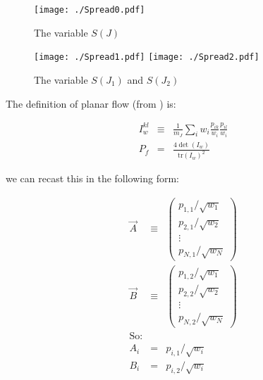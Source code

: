 \begin{figure}[H]
    \begin{center}
        \texttt{[image: ./Spread0.pdf]}
        \caption{ The variable $S\left(J\right)$  }
        \label{fig:Spread0}
    \end{center}
\end{figure}

\begin{figure}[H]
    \begin{center}
        \texttt{[image: ./Spread1.pdf]}
        \texttt{[image: ./Spread2.pdf]}\\
        \caption{ The variable $S\left(J_1\right)$  and $S\left(J_2\right)$ }
        \label{fig:SpreadX}
    \end{center}
\end{figure}

The definition of planar flow (from \cite{PlanarFlow}) is:

\begin{eqnarray*}
	I_{w}^{kl} & \equiv & \frac{1}{m_{J}}\sum_{i}w_{i}\frac{p_{ik}}{w_{i}}\frac{p_{il}}{w_{i}}\\
	P_{f} & = & \frac{4\det\left(I_{w}\right)}{\text{tr}\left(I_{w}\right)^{2}}
\end{eqnarray*}

we can recast this in the following form:


\begin{eqnarray*}
	\vec{A} & \equiv & \left(\begin{array}{c}
		p_{1,1}/\sqrt{w_{1}}\\
		p_{2,1}/\sqrt{w_{2}}\\
		\vdots\\
		p_{N,1}/\sqrt{w_{N}}
	\end{array}\right)\\
	\vec{B} & \equiv & \left(\begin{array}{c}
		p_{1,2}/\sqrt{w_{1}}\\
		p_{2,2}/\sqrt{w_{2}}\\
		\vdots\\
		p_{N,2}/\sqrt{w_{N}}
	\end{array}\right)\\
	\text{So:}\\
	A_{i} & = & p_{i,1}/\sqrt{w_{i}}\\
	B_{i} & = & p_{i,2}/\sqrt{w_{i}}
\end{eqnarray*}


